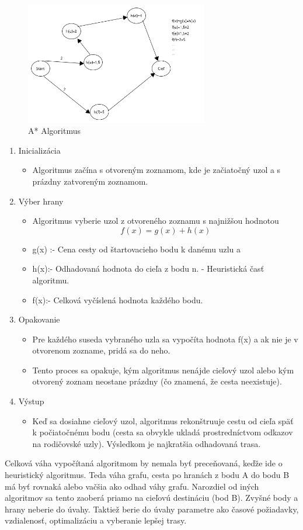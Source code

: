 \documentclass[10pt,slovak,a4paper]{article}
\begin{document}
\begin{figure}[h]
  \centering
  \includegraphics[width=8cm]{a-star}
  \caption{A* Algoritmus}
\end{figure}
	\begin{enumerate}
\item Inicializácia
	\begin{itemize}
\item
Algoritmus začína s otvoreným zoznamom, kde je začiatočný uzol a s prázdny zatvoreným zoznamom.
\end{itemize}
\item  Výber hrany
	\begin{itemize}
	\item Algoritmus vyberie uzol z otvoreného zoznamu s najnižšou hodnotou $$ f(x)=g(x)+h(x)$$
	\item g(x) :- Cena cesty od štartovacieho bodu k danému uzlu a 
	\item h(x):- Odhadovaná hodnota do cieľa z bodu n. - Heuristická časť algoritmu.
	\item f(x):- Celková vyčíslená hodnota každého bodu.
	\end{itemize}
\item Opakovanie
	\begin{itemize}
	\item Pre každého suseda vybraného uzla sa vypočíta hodnota f(x) a ak nie je v otvorenom zozname, pridá sa do neho.	
	\item  Tento proces sa opakuje, kým algoritmus nenájde cieľový uzol alebo kým otvorený zoznam neostane prázdny (čo znamená, že cesta neexistuje).
	\end{itemize}
\item Výstup
	\begin{itemize}
	\item Keď sa dosiahne cieľový uzol, algoritmus rekonštruuje cestu od cieľa späť k počiatočnému bodu (cesta sa obvykle ukladá prostredníctvom odkazov na rodičovské uzly).
Výsledkom je najkratšia odhadovaná trasa.
	\end{itemize}
\end{enumerate}
Celková váha vypočítaná algoritmom by nemala byť preceňovaná, keďže ide o heuristický algoritmus. Teda váha grafu, cesta po hranách z bodu A do bodu B má byť rovnaká alebo vačšia ako odhad váhy grafu. Narozdiel od iných algoritmov sa tento zaoberá priamo na cieľovú destináciu (bod B). Zvyšné body a hrany neberie do úvahy. Taktiež berie do úvahy parametre ako časové požiadavky, vzdialenosť, optimalizáciu a vyberanie lepšej trasy. 
\end{document}
